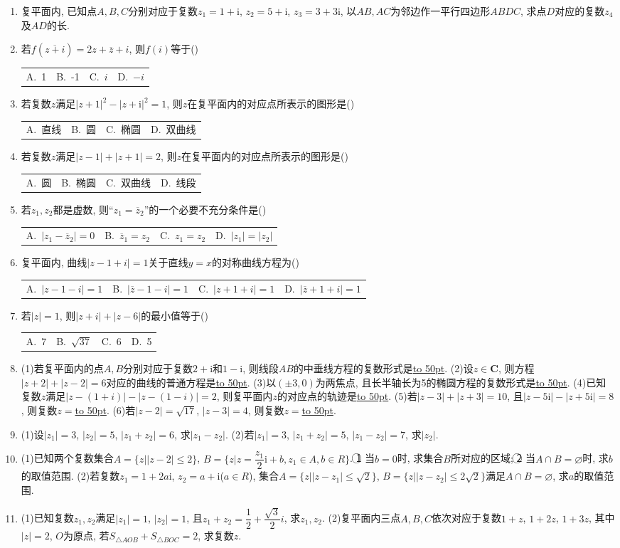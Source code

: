 \documentclass[10pt,a4paper]{article}
\newcommand{\blank}[1]{\underline{\hbox to #1pt{}}}
\newcommand{\fourch}[4]{\par\begin{tabular}{p{.23\textwidth}p{.23\textwidth}p{.23\textwidth}p{.23\textwidth}}
A.~#1 &B.~#2& C.~#3& D.~#4
\end{tabular}}
\begin{document}
\begin{enumerate}[1.]
(4)若$|z-1-2i|=1$, 则$|z-3-i|$的取值范围是\blank{50}.
\item 复平面内, 已知点$A,B,C$分别对应于复数$z_1=1+\mathrm{i}$, $z_2=5+\mathrm{i}$, $z_3=3+3\mathrm{i}$, 以$AB,AC$为邻边作一平行四边形$ABDC$, 求点$D$对应的复数$z_4$及$AD$的长.
\item 若$f(\overline{z+i})=2z+\overline z+i$, 则$f(i)$等于()
\fourch{1}{-1}{$i$}{$-i$}
\item 若复数$z$满足$|z+1|^2-|z+\mathrm{i}|^2=1$, 则$z$在复平面内的对应点所表示的图形是()
\fourch{直线}{圆}{椭圆}{双曲线}
\item 若复数$z$满足$|z-1|+|z+1|=2$, 则$z$在复平面内的对应点所表示的图形是()
\fourch{圆}{椭圆}{双曲线}{线段}
\item 若$z_1,z_2$都是虚数, 则``$z_1=\overline z_2$''的一个必要不充分条件是()
\fourch{$|z_1-\overline z_2|=0$}{$\overline z_1=z_2$}{$z_1=z_2$}{$|z_1|=|z_2|$}
\item 复平面内, 曲线$|z-1+i|=1$关于直线$y=x$的对称曲线方程为()
\fourch{$|z-1-i|=1$}{$|\overline z-1-i|=1$}{$|z+1+i|=1$}{$|\overline z+1+i|=1$}
\item 若$|z|=1$, 则$|z+i|+|z-6|$的最小值等于()
\fourch{7}{$\sqrt {37}$}{6}{5}
\item (1)若复平面内的点$A,B$分别对应于复数$2+\mathrm{i}$和$1-\mathrm{i}$, 则线段$AB$的中垂线方程的复数形式是\blank{50}.
(2)设$z\in \mathbf{C}$, 则方程$|z+2|+|z-2|=6$对应的曲线的普通方程是\blank{50}.
(3)以$(\pm 3,0)$为两焦点, 且长半轴长为5的椭圆方程的复数形式是\blank{50}.
(4)已知复数$z$满足$|z-(1+i)|-|z-(1-i)|=2$, 则复平面内$z$的对应点的轨迹是\blank{50}.
(5)若$|z-3|+|z+3|=10$, 且$|z-5\mathrm{i}|-|z+5\mathrm{i}|=8$, 则复数$z=$\blank{50}.
(6)若$|z-2|=\sqrt {17}$, $|z-3|=4$, 则复数$z=$\blank{50}.
\item (1)设$|z_1|=3$, $|z_2|=5$, $|z_1+z_2|=6$, 求$|z_1-z_2|$.
(2)若$|z_1|=3$, $|z_1+z_2|=5$, $|z_1-z_2|=7$, 求$|z_2|$.
\item (1)已知两个复数集合$A=\{z||z-2|\le 2\}$, $B=\{z|z=\dfrac{z_1}2\mathrm{i}+b,z_1\in A,b\in R\}$.
\textcircled{1} 当$b=0$时, 求集合$B$所对应的区域;
\textcircled{2} 当$A\cap B=\varnothing$时, 求$b$的取值范围.
(2)若复数$z_1=1+2a\mathrm{i}$, $z_2=a+\mathrm{i}$($a\in R$), 集合$A=\{z||z-z_1|\le \sqrt 2\}$, $B=\{z||z-z_2|\le 2\sqrt 2\}$满足$A\cap B=\varnothing$, 求$a$的取值范围.
\item (1)已知复数$z_1,z_2$满足$|z_1|=1$, $|z_2|=1$, 且$z_1+z_2=\dfrac 12+\dfrac{\sqrt 3}2i$, 求$z_1,z_2$.
(2)复平面内三点$A,B,C$依次对应于复数$1+z$, $1+2z$, $1+3z$, 其中$|z|=2$, $O$为原点, 若$S_{\triangle AOB}+S_{\triangle BOC}=2$, 求复数$z$.

\end{enumerate}
\end{document}
